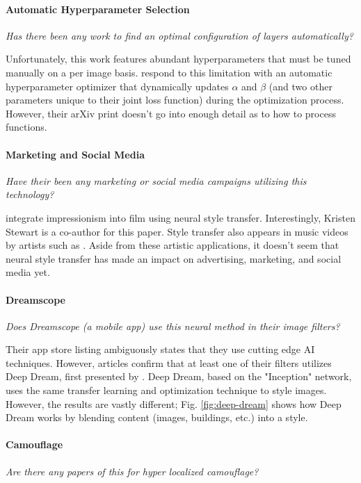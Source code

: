 \documentclass{article}
\begin{document}
\paragraph{Automatic Hyperparameter Selection} \textit{Has there been any
work to find an optimal configuration of layers automatically?}

Unfortunately, this work features abundant hyperparameters that must be tuned
manually on a per image basis. \cite{2017arXiv170108893R} respond to this
limitation with an automatic hyperparameter optimizer that dynamically
updates $\alpha$ and $\beta$ (and two other parameters unique to their joint
loss function) during the optimization process. However, their arXiv print
doesn't go into enough detail as to how to process functions.

\paragraph{Marketing and Social Media} \textit{Have their been any marketing
or social media campaigns utilizing this technology?}

\cite{2017arXiv170104928J} integrate impressionism into film using neural
style transfer. Interestingly, Kristen Stewart is a co-author for this paper.
Style transfer also appears in music videos by artists such as \cite{MGMT}.
Aside from these artistic applications, it doesn't seem that neural style
transfer has made an impact on advertising, marketing, and social media yet.

\paragraph{Dreamscope} \textit{Does Dreamscope (a mobile app) use this
neural method in their image filters?}

Their app store listing ambiguously states that they use cutting edge AI
techniques. However, articles confirm that at least one of their filters
utilizes Deep Dream, first presented by \cite{deep-dream}. Deep Dream, based
on the "Inception" network, uses the same transfer learning and optimization
technique to style images. However, the results are vastly different; Fig.
\ref{fig:deep-dream} shows how Deep Dream works by blending content (images,
buildings, etc.) into a style.

\paragraph{Camouflage} \textit{Are there any papers of this for hyper
localized camouflage?}
\end{document}
